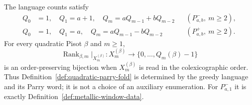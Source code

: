 \begin{proposition}
\label{prop:parry-rank-bijection}
The language counts satisfy
\begin{align}
Q_0&=1,\quad Q_1=a+1,\quad Q_m=aQ_{m-1}+bQ_{m-2}
&& (P^-_{a,b},\ m\ge2),\label{eq:qminus}\\
Q_0&=1,\quad Q_1=a,\quad Q_m=aQ_{m-1}-bQ_{m-2}
&& (P^+_{a,b},\ m\ge2).\label{eq:qplus}
\end{align}
For every quadratic Pisot $\beta$ and $m\ge1$,
\[
\operatorname{Rank}_{\beta,m}|_{X_m^{(\beta)}}:
X_m^{(\beta)}\longrightarrow\{0,\ldots,Q_m(\beta)-1\}
\]
is an order-preserving bijection when $X_m^{(\beta)}$ is read in the
colexicographic order.  Thus Definition~\ref{def:quadratic-parry-fold} is
determined by the greedy language and its Parry word; it is not a choice of
an auxiliary enumeration.  For $P^-_{a,1}$ it is exactly
Definition~\ref{def:metallic-window-data}.
\end{proposition}

